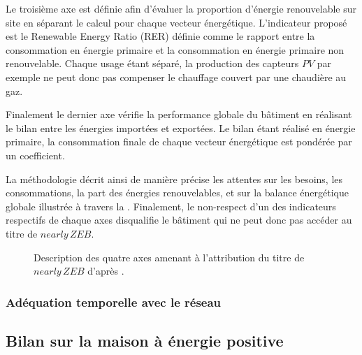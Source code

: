 Le troisième axe est définie afin d’évaluer la proportion d’énergie renouvelable sur site en séparant
le calcul pour chaque vecteur énergétique. L’indicateur proposé est le Renewable Energy Ratio
(RER) définie comme le rapport entre la consommation en énergie primaire et la consommation
en énergie primaire non renouvelable. Chaque usage étant séparé, la production des
capteurs $PV$ par exemple ne peut donc pas compenser le chauffage couvert par une chaudière
au gaz.

Finalement le dernier axe vérifie la performance globale du bâtiment en réalisant
le bilan entre les énergies importées et exportées. Le bilan étant réalisé en énergie
primaire, la consommation finale de chaque vecteur énergétique est pondérée par un
coefficient.

La méthodologie décrit ainsi de manière précise les attentes sur les besoins, les
consommations, la part des énergies renouvelables, et sur la balance énergétique globale
illustrée à travers la .
Finalement, le non-respect d’un des indicateurs respectifs de chaque axes disqualifie le bâtiment
qui ne peut donc pas accéder au titre de $nearly\,ZEB$.

\begin{figure}
    \centering
    \caption{Description des quatre axes amenant à l’attribution du titre de
             $nearly\,ZEB$ d’après \textcite{Zirngibl2014}.}
    \label{fig:attribution_nZEB}
\end{figure}


\subsubsection{Adéquation temporelle avec le réseau} %
\label{ssub:adequation_temporelle_avec_le_reseau}




\subsection{Bilan sur la maison à énergie positive} %
\label{sub:bilan_sur_la_BEPOS}





